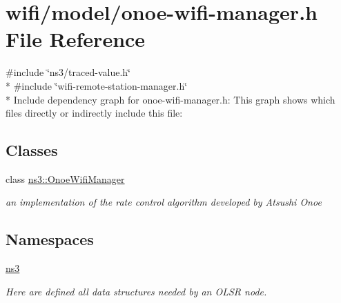 \hypertarget{onoe-wifi-manager_8h}{}\section{wifi/model/onoe-\/wifi-\/manager.h File Reference}
\label{onoe-wifi-manager_8h}
{\ttfamily \#include \char`\"{}ns3/traced-\/value.\+h\char`\"{}}\\*
{\ttfamily \#include \char`\"{}wifi-\/remote-\/station-\/manager.\+h\char`\"{}}\\*
Include dependency graph for onoe-\/wifi-\/manager.h\+:
This graph shows which files directly or indirectly include this file\+:
\subsection*{Classes}
\begin{DoxyCompactItemize}
\item 
class \hyperlink{classns3_1_1OnoeWifiManager}{ns3\+::\+Onoe\+Wifi\+Manager}
\begin{DoxyCompactList}\small\item\em an implementation of the rate control algorithm developed by Atsushi Onoe \end{DoxyCompactList}\end{DoxyCompactItemize}
\subsection*{Namespaces}
\begin{DoxyCompactItemize}
\item 
 \hyperlink{namespacens3}{ns3}
\begin{DoxyCompactList}\small\item\em Here are defined all data structures needed by an O\+L\+SR node. \end{DoxyCompactList}\end{DoxyCompactItemize}
